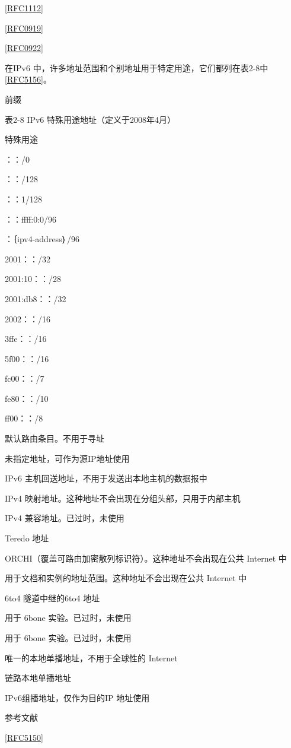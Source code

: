 \href{https://www.rfc-editor.org/rfc/rfc1112}{[RFC1112]}

\href{https://www.rfc-editor.org/rfc/rfc0919}{[RFC0919]}

\href{https://www.rfc-editor.org/rfc/rfc0922}{[RFC0922]}

在IPv6 中，许多地址范围和个别地址用于特定用途，它们都列在表2-8中\href{https://www.rfc-editor.org/rfc/rfc5156}{[RFC5156]}。

前缀

表2-8 IPv6 特殊用途地址（定义于2008年4月）

特殊用途

：：/0

：：/128

：：1/128

：：ffff:0:0/96

：｛ipv4-address｝/96

2001：：/32

2001:10：：/28

2001:db8：：/32

2002：：/16

3ffe：：/16

5f00：：/16

fc00：：/7

fe80：：/10

ff00：：/8

默认路由条目。不用于寻址

未指定地址，可作为源IP地址使用

IPv6 主机回送地址，不用于发送出本地主机的数据报中

IPv4 映射地址。这种地址不会出现在分组头部，只用于内部主机

IPv4 兼容地址。已过时，未使用

Teredo 地址

ORCHI（覆盖可路由加密散列标识符）。这种地址不会出现在公共 Internet 中

用于文档和实例的地址范围。这种地址不会出现在公共 Internet 中

6to4 隧道中继的6to4 地址

用于 6bone 实验。已过时，未使用

用于 6bone 实验。已过时，未使用

唯一的本地单播地址，不用于全球性的 Internet

链路本地单播地址

IPv6组播地址，仅作为目的IP 地址使用

参考文献

\href{https://www.rfc-editor.org/rfc/rfc5150}{[RFC5150]}


